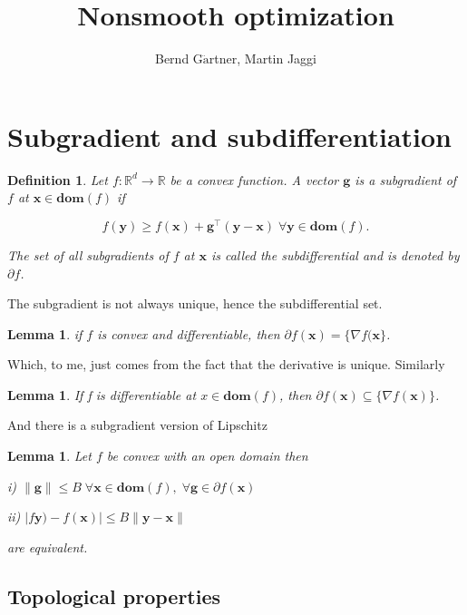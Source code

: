 \documentclass{article}
\newtheorem{definition}[theorem]{Definition}
\newtheorem{lemma}[theorem]{Lemma}
\begin{document}
\title{Nonsmooth optimization}
\author{Bernd G$\ddot{\text{a}}$rtner, Martin Jaggi}
\date{}

\maketitle

\section{Subgradient and subdifferentiation}

	\begin{definition}
		Let $f:\mathbb{R}^d\to\mathbb{R}$ be a convex function. A vector $\mathbf{g}$ is a subgradient of $f$ at $\mathbf{x}\in\mathbf{dom}(f)$ if
		
		\[ f(\mathbf{y}) \ge f(\mathbf{x}) + \mathbf{g}^\top (\mathbf{y-x}) \; \forall\mathbf{y}\in\mathbf{dom}(f). \]
		
		The set of all subgradients of $f$ at $\mathbf{x}$ is called the \textnormal{subdifferential} and is denoted by $\partial f$.
	\end{definition}
	
	The subgradient is not always unique, hence the subdifferential set.
	
	\begin{lemma}
		if $f$ is convex and differentiable, then $\partial f(\mathbf{x}) = \{ \nabla f(\mathbf{x} \}$.
	\end{lemma}
	
	Which, to me, just comes from the fact that the derivative is unique. Similarly
	
	\begin{lemma}
		If f is differentiable at $x\in\mathbf{dom}(f)$, then $\partial f(\mathbf{x})\subseteq \{ \nabla f(\mathbf{x}) \}$.
	\end{lemma}
	
	And there is a subgradient version of Lipschitz
	
	\begin{lemma}
		Let $f$ be convex with an open domain then
		
		i) $\|\mathbf{g}\| \le B\;\forall \mathbf{x}\in\mathbf{dom}(f),\;\forall\mathbf{g}\in\partial f(\mathbf{x})$
		
		ii) $|f\mathbf{y}) - f(\mathbf{x})| \le B\|\mathbf{y-x}\|$
		
		are equivalent.
	\end{lemma}
	
	\subsection{Topological properties}
	
\end{document}
